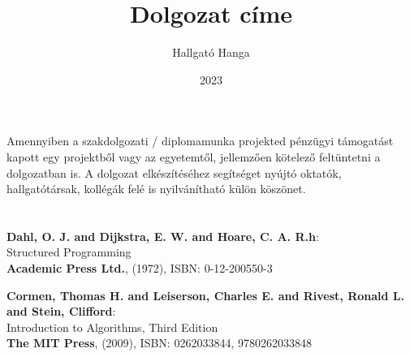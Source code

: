 \documentclass[
]{elteikthesis}[2023/04/10]
\title{Dolgozat címe} %
\date{2023} %
\author{Hallgató Hanga}
\affiliation{egyetemi tanársegéd} %
\begin{document}


\maketitle
%

\tableofcontents
\cleardoublepage


\cleardoublepage


\cleardoublepage


\cleardoublepage


\cleardoublepage

\chapter*{\acklabel}
Amennyiben a szakdolgozati / diplomamunka projekted pénzügyi támogatást kapott egy projektből vagy az egyetemtől, jellemzően kötelező feltüntetni a dolgozatban is. A dolgozat elkészítéséhez segítséget nyújtó oktatók, hallgatótársak, kollégák felé is nyilvánítható külön köszönet.
\cleardoublepage

%
\cleardoublepage

\chapter*{\biblabel}

\label{bib:dahl1972structured}
\textbf{Dahl, O. J. and Dijkstra, E. W. and Hoare, C. A. R.h}:\\
Structured Programming\\
\textbf{Academic Press Ltd.}, (1972), ISBN: 0-12-200550-3

\label{bib:cormen2009algorithms}
\textbf{Cormen, Thomas H. and Leiserson, Charles E. and Rivest, Ronald L. and Stein, Clifford}:\\
Introduction to Algorithms, Third Edition\\
\textbf{The MIT Press}, (2009), ISBN: 0262033844, 9780262033848
\end{document}
